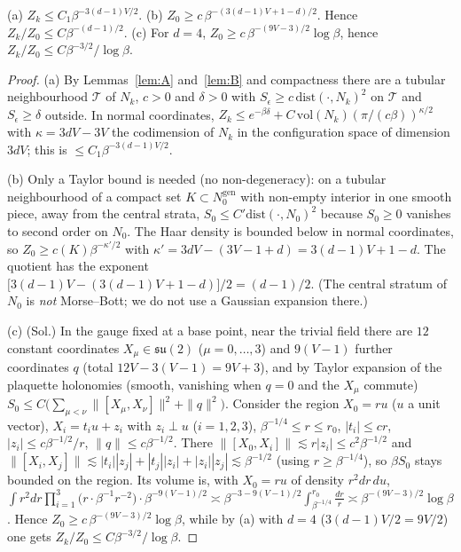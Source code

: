 \begin{lemma}[Laplace]\label{lem:C}
(a) $Z_k\le C_1\beta^{-3(d-1)V/2}$. (b) $Z_0\ge c\,\beta^{-(3(d-1)V+1-d)/2}$. Hence $Z_k/Z_0\le C\beta^{-(d-1)/2}$. (c) For $d=4$, $Z_0\ge c\,\beta^{-(9V-3)/2}\log\beta$, hence $Z_k/Z_0\le C\beta^{-3/2}/\log\beta$.
\end{lemma}
\begin{proof}
(a) By Lemmas~\ref{lem:A} and~\ref{lem:B} and compactness there are a tubular neighbourhood $\mathcal T$ of $N_k$, $c>0$ and $\delta>0$ with $S_\epsilon\ge c\,\mathrm{dist}(\cdot,N_k)^2$ on $\mathcal T$ and $S_\epsilon\ge\delta$ outside. In normal coordinates, $Z_k\le e^{-\beta\delta}+C\,\mathrm{vol}(N_k)(\pi/(c\beta))^{\kappa/2}$ with $\kappa=3dV-3V$ the codimension of $N_k$ in the configuration space of dimension $3dV$; this is $\le C_1\beta^{-3(d-1)V/2}$.

(b) Only a Taylor bound is needed (no non-degeneracy): on a tubular neighbourhood of a compact set $K\subset N_0^{\mathrm{gen}}$ with non-empty interior in one smooth piece, away from the central strata, $S_0\le C'\mathrm{dist}(\cdot,N_0)^2$ because $S_0\ge0$ vanishes to second order on $N_0$. The Haar density is bounded below in normal coordinates, so $Z_0\ge c(K)\beta^{-\kappa'/2}$ with $\kappa'=3dV-(3V-1+d)=3(d-1)V+1-d$. The quotient has the exponent $\bigl[3(d-1)V-(3(d-1)V+1-d)\bigr]/2=(d-1)/2$. (The central stratum of $N_0$ is \emph{not} Morse--Bott; we do not use a Gaussian expansion there.)

(c) (Sol.) In the gauge fixed at a base point, near the trivial field there are $12$ constant coordinates $X_\mu\in\mathfrak{su}(2)$ ($\mu=0,\dots,3$) and $9(V-1)$ further coordinates $q$ (total $12V-3(V-1)=9V+3$), and by Taylor expansion of the plaquette holonomies (smooth, vanishing when $q=0$ and the $X_\mu$ commute) $S_0\le C\bigl(\sum_{\mu<\nu}\|[X_\mu,X_\nu]\|^2+\|q\|^2\bigr)$. Consider the region $X_0=ru$ ($u$ a unit vector), $X_i=t_iu+z_i$ with $z_i\perp u$ ($i=1,2,3$), $\beta^{-1/4}\le r\le r_0$, $|t_i|\le cr$, $|z_i|\le c\beta^{-1/2}/r$, $\|q\|\le c\beta^{-1/2}$. There $\|[X_0,X_i]\|\lesssim r|z_i|\le c^2\beta^{-1/2}$ and $\|[X_i,X_j]\|\lesssim|t_i||z_j|+|t_j||z_i|+|z_i||z_j|\lesssim\beta^{-1/2}$ (using $r\ge\beta^{-1/4}$), so $\beta S_0$ stays bounded on the region. Its volume is, with $X_0=ru$ of density $r^2dr\,du$, $\int r^2dr\prod_{i=1}^3\bigl(r\cdot\beta^{-1}r^{-2}\bigr)\cdot\beta^{-9(V-1)/2}\asymp\beta^{-3-9(V-1)/2}\int_{\beta^{-1/4}}^{r_0}\frac{dr}{r}\asymp\beta^{-(9V-3)/2}\log\beta$. Hence $Z_0\ge c\,\beta^{-(9V-3)/2}\log\beta$, while by (a) with $d=4$ ($3(d-1)V/2=9V/2$) one gets $Z_k/Z_0\le C\beta^{-3/2}/\log\beta$.
\end{proof}

